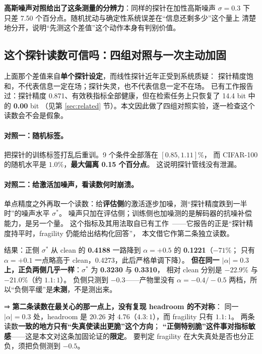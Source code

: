 \documentclass[11pt,a4paper]{ctexart}
\begin{document}
\textbf{高斯噪声对照给出了这条测量的分辨力}：同样的探针在加性高斯噪声 $\sigma=0.3$ 下
只差 7.50 个百分点。随机扰动与确定性系统误差在“信息还剩多少”这个量上
清楚地分开，说明“先测这个差值”这个动作本身有判别价值。

\subsection{这个探针读数可信吗：四组对照与一次主动加固}

上面那个差值来自\textbf{单个探针设定}，而线性探针近年正受到系统质疑：
探针精度饱和，不代表信息一定在场；探针失灵，也不代表信息一定不在场。
已有工作报告过：探针精度 0.871、有效秩指标全部健康，但在检索任务上只恢复了 14.4 bit 中的 \textbf{0.00} bit
（见第 \ref{sec:related} 节）。本文因此做了四组对照实验，逐一检查这个读数会不会是假象。

\paragraph{对照一：随机标签。}
把探针的训练标签打乱后重训。9 个条件全部落在 $[0.85,1.11]\%$，
而 CIFAR-100 的随机水平是 $1.0\%$，\textbf{最大偏离 0.15 个百分点}。
这说明探针管线没有泄漏。

\paragraph{对照二：给激活加噪声，看读数何时崩溃。}
单点精度之外再取一个读数：给\textbf{评估侧}的激活逐步加噪，测“探针精度跌到一半时”的噪声水平 $\sigma^*$。
噪声只加在评估侧；训练侧也加噪测的是解码器的抗噪补偿能力，是另一个量。
这个指标及其用法取自已有工作~\cite{fragility}——它报告的正是“探针精度持平时，fragility 仍能给出结构化回答”，
本文借它作第二条独立读数。

结果：正侧 $\sigma^*$ 从 clean 的 \textbf{0.4188} 一路降到 $\alpha=+0.5$ 的 \textbf{0.1221}（$-71\%$；
只有 $\alpha=+0.1$ 一点略高于 clean，0.4273，此后严格单调下降）。
\textbf{但在同一 $|\alpha|=0.3$ 上，正负两侧几乎一样}：$\sigma^*$ 为 \textbf{0.3230} 与 \textbf{0.3310}，
相对 clean 分别是 $\mathbf{-22.9\%}$ 与 $\mathbf{-21.0\%}$（约 $1.1:1$）。
负侧只测到 $-0.3$——产物里没有 $\alpha=-0.4/-0.5$ 两档，所以“负侧平缓”是\textbf{未测}，不是测出来。

⇒ \textbf{第二条读数在最关心的那一点上，没有复现 headroom 的不对称}：
同一 $|\alpha|=0.3$ 处，headroom 是 $20.26$ 对 $4.76$（$4.3:1$），而 fragility 只有 $1.1:1$。
两条读数\textbf{一致的地方只有“失真使读出更脆”这个方向}；
\textbf{“正侧特别脆”这件事对指标敏感}——这是本文对这条加固论证的\textbf{限定}。
要判定 fragility 在大失真处是否也分正负，须把负侧测到 $-0.5$。
\end{document}
